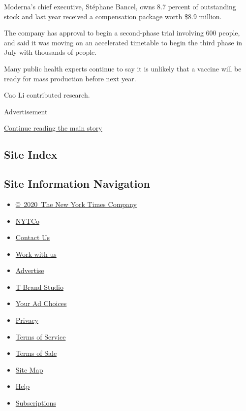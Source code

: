 Moderna's chief executive, Stéphane Bancel, owns 8.7 percent of
outstanding stock and last year received a compensation package worth
\$8.9 million.

The company has approval to begin a second-phase trial involving 600
people, and said it was moving on an accelerated timetable to begin the
third phase in July with thousands of people.

Many public health experts continue to say it is unlikely that a vaccine
will be ready for mass production before next year.

Cao Li contributed research.

Advertisement

\protect\hyperlink{after-bottom}{Continue reading the main story}

\hypertarget{site-index}{%
\subsection{Site Index}\label{site-index}}

\hypertarget{site-information-navigation}{%
\subsection{Site Information
Navigation}\label{site-information-navigation}}

\begin{itemize}
\tightlist
\item
  \href{https://help.nytimes.com/hc/en-us/articles/115014792127-Copyright-notice}{©~2020~The
  New York Times Company}
\end{itemize}

\begin{itemize}
\tightlist
\item
  \href{https://www.nytco.com/}{NYTCo}
\item
  \href{https://help.nytimes.com/hc/en-us/articles/115015385887-Contact-Us}{Contact
  Us}
\item
  \href{https://www.nytco.com/careers/}{Work with us}
\item
  \href{https://nytmediakit.com/}{Advertise}
\item
  \href{http://www.tbrandstudio.com/}{T Brand Studio}
\item
  \href{https://www.nytimes.com/privacy/cookie-policy\#how-do-i-manage-trackers}{Your
  Ad Choices}
\item
  \href{https://www.nytimes.com/privacy}{Privacy}
\item
  \href{https://help.nytimes.com/hc/en-us/articles/115014893428-Terms-of-service}{Terms
  of Service}
\item
  \href{https://help.nytimes.com/hc/en-us/articles/115014893968-Terms-of-sale}{Terms
  of Sale}
\item
  \href{https://spiderbites.nytimes.com}{Site Map}
\item
  \href{https://help.nytimes.com/hc/en-us}{Help}
\item
  \href{https://www.nytimes.com/subscription?campaignId=37WXW}{Subscriptions}
\end{itemize}
